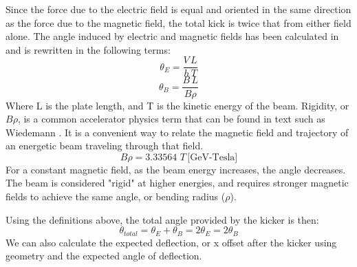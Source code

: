 Since the force due to the electric field is equal and oriented in the same direction as the force due to the magnetic field, 
the total kick is twice that from either field alone.  
The angle induced by electric and magnetic fields has been calculated in \cite{iukicker, Wiedemann}
and is rewritten in the following terms:  
\begin{equation}
\theta_E= \frac{V\,L}{h\,T}
\end{equation}
\begin{equation}
\theta_B= \frac{B\,L}{B\rho}
\end{equation}
Where L is the plate length, and T is the kinetic energy of the beam. 
Rigidity, or $B\rho$, is a common accelerator physics term that can be found in text such as Wiedemann \cite{Wiedemann}. 
It is a convenient way to relate the magnetic field and trajectory of an energetic beam traveling through that field.
\begin{equation}
	B\rho=3.33564\,\,T\, \text{[GeV-Tesla]}
\end{equation} 
For a constant magnetic field, as the beam energy increases, the angle decreases. 
The beam is considered "rigid" at higher energies, 
and requires stronger magnetic fields to achieve the same angle, or bending radius ($\rho$).

Using the definitions above, the total angle provided by the kicker is then: 
\begin{equation}
\theta_{total}= \theta_E+\theta_B=2\theta_E=2\theta_B
\end{equation}
We can also calculate the expected deflection, or x offset after the kicker 
using geometry and the expected angle of deflection. 

